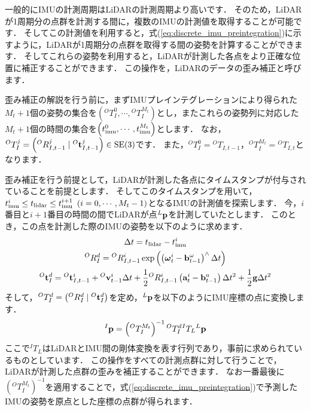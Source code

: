 一般的にIMUの計測周期はLiDARの計測周期より高いです．
そのため，LiDARが1周期分の点群を計測する間に，複数のIMUの計測値を取得することが可能です．
そしてこの計測値を利用すると，式(\ref{eq:discrete_imu_preintegration})に示すように，LiDARが1周期分の点群を取得する間の姿勢を計算することができます．
そしてこれらの姿勢を利用すると，LiDARが計測した各点をより正確な位置に補正することができます．
この操作を，LiDARのデータの歪み補正と呼びます．

歪み補正の解説を行う前に，まずIMUプレインテグレーションにより得られた$M_{t}+1$個の姿勢の集合を$\left( {}^{O}T_{I}^{0}, \cdots, {}^{O}T_{I}^{M_{t}} \right)$とし，またこれらの姿勢列に対応した$M_{t}+1$個の時間の集合を$\left( t_{\rm imu}^{0}, \cdots, t_{\rm imu}^{M_{t}} \right)$とします．
なお，${}^{O}T_{I}^{j} = \left( {}^{O}R_{I, t-1}^{j} \mid {}^{O}{\bf t}_{I, t-1}^{j} \right) \in {\rm SE}(3)$です．
また，${}^{O}T_{I}^{0} = {}^{O}T_{I, t-1}$，${}^{O}T_{I}^{M_{t}} = {}^{O}T_{I, t}$となります．

歪み補正を行う前提として，LiDARが計測した各点にタイムスタンプが付与されていることを前提とします．
そしてこのタイムスタンプを用いて，$t_{\rm imu}^{i} \leq t_{\rm lidar} \leq t_{\rm imu}^{i+1} ~ \left( i = 0, \cdots, M_{t}-1 \right)$となるIMUの計測値を探索します．
今，$i$番目と$i+1$番目の時間の間でLiDARが点${}^{L}{\bf p}$を計測していたとします．
このとき，この点を計測した際のIMUの姿勢を以下のように求めます．
%
\begin{align}
  \begin{gathered}
    \Delta t = t_{\rm lidar} - t_{\rm imu}^{i} \\
%
    {}^{O}R_{I}^{d} = {}^{O}R_{I, t-1}^{i} \exp \left( \left( \boldsymbol \omega_{t}^{i} - {\bf b}_{t-1}^{\omega} 
\right)^{\wedge} \Delta t \right) \\
%
    {}^{O}{\bf t}_{I}^{d} = {}^{O}{\bf t}_{I, t-1}^{i} + {}^{O}{\bf v}_{t-1}^{i} \Delta t + \frac{1}{2} {}^{O}R_{I, t-1}^{i} \left( {\bf a}_{t}^{i} - {\bf b}_{t-1}^{a} \right) \Delta t^{2} + \frac{1}{2} {\bf g} \Delta t^{2}
  \end{gathered}
\end{align}
%
そして，${}^{O}T_{I}^{d} = \left( {}^{O}R_{I}^{d} \mid {}^{O}{\bf t}_{I}^{d} \right)$を定め，${}^{L}{\bf p}$を以下のようにIMU座標の点に変換します．
%
\begin{align}
  {}^{I}{\bf p} = \left( {}^{O}T_{I}^{M_{t}} \right)^{-1} {}^{O}T_{I}^{d} {}^{I}T_{L} {}^{L}{\bf p}
\end{align}
%
ここで${}^{I}T_{L}$はLiDARとIMU間の剛体変換を表す行列であり，事前に求められているものとしています．
この操作をすべての計測点群に対して行うことで，LiDARが計測した点群の歪みを補正することができます．
なお一番最後に$\left( {}^{O}T_{I}^{M_{t}} \right)^{-1}$を適用することで，式(\ref{eq:discrete_imu_preintegration})で予測したIMUの姿勢を原点とした座標の点群が得られます．


















